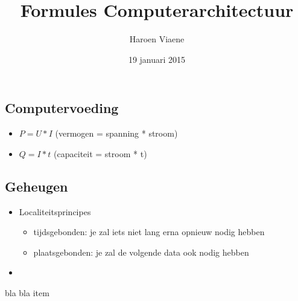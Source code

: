 \documentclass[11pt]{article}
\title{Formules Computerarchitectuur}
\author{Haroen Viaene}
\date{19 januari 2015}
\let\originalitem\item
\renewcommand{\item}{\originalitem[]}
\newcommand{\Newpage}{\end{preview}\begin{preview}}
\begin{document}
\begin{preview}


\maketitle

\Newpage

\section{Computervoeding}

\begin{itemize}
	\item $P = U * I$ (vermogen = spanning * stroom)
	\item $Q = I * t$ (capaciteit = stroom * t)
\end{itemize}

\Newpage

\section{Geheugen}

\begin{itemize}
	\item Localiteitsprincipes
	\begin{itemize}
		\item tijdsgebonden: je zal iets niet lang erna opnieuw nodig hebben
		\item plaatsgebonden: je zal de volgende data ook nodig hebben
	\end{itemize}
	\item 
\end{itemize}

\begin{itemize}
	bla
	bla
	item 
\end{itemize}

\end{preview}
\end{document}
